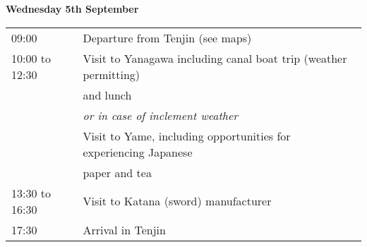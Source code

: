 \newpage
\begin{center}
{\bf \large Wednesday 5th September}
\end{center}
\vspace*{3ex}

\noindent\begin{tabular}{|l|l|}
    \hline
    09:00           & Departure from Tenjin (see maps)\\
    10:00 to 12:30  & Visit to Yanagawa including canal boat trip (weather permitting) \\
                    & and lunch\\
                    & \emph{or in case of inclement weather} \\
                    & Visit to Yame, including opportunities for experiencing Japanese \\
                    & paper and tea \\
    13:30 to 16:30  & Visit to Katana (sword) manufacturer \\
    17:30           & Arrival in Tenjin\\
    \hline
\end{tabular}
